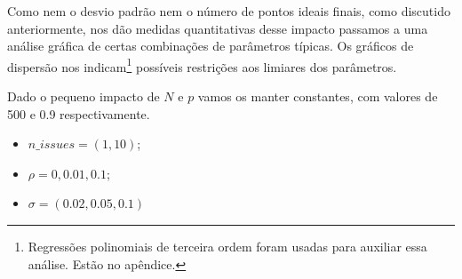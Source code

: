     Como nem o desvio padrão nem o número de pontos ideais finais,
    como discutido anteriormente, nos dão medidas quantitativas desse impacto
    passamos a uma análise gráfica de certas combinações de parâmetros típicas.
    Os gráficos de dispersão nos indicam\footnote{Regressões polinomiais de
      terceira ordem foram usadas para auxiliar essa análise. Estão no
      apêndice.} possíveis restrições aos limiares dos parâmetros.

    Dado o pequeno impacto de \(N\) e \(p\) vamos os manter constantes, com
    valores de 500 e 0.9 respectivamente.

    \begin{itemize}
    \item \(n\_issues = (1, 10)\);
    \item \(\rho  = 0, 0.01, 0.1\);
    \item \(\sigma = (0.02, 0.05, 0.1)\)
    \end{itemize}



